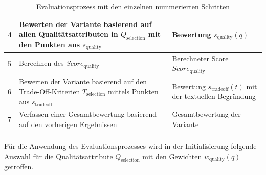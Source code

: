 \begin{longtable}{|
  L{1cm}|
  p{\dimexpr\textwidth-4cm-6\arrayrulewidth\relax}|
  L{3cm}|
}
    4 & Bewerten der Variante basierend auf allen Qualitätsattributen in $Q_{\text{selection}}$ mit den Punkten aus $s_{\text{quality}}$ &
    Bewertung $s_{\text{quality}}(q)$
    \\
    \hline

    5 & Berechnen des $Score_{\text{quality}}$ &
    Berechneter Score $Score_{\text{quality}}$
    \\
    \hline

    6 & Bewerten der Variante basierend auf den Trade-Off-Kriterien $T_{\text{selection}}$ mittels Punkten aus $s_{\text{tradeoff}}$ &
    Bewertung $s_{\text{tradeoff}}(t)$ mit der textuellen Begründung
    \\
    \hline

    7 & Verfassen einer Gesamtbewertung basierend auf den vorherigen Ergebnissen & Gesamtbewertung der Variante
    \\
    \hline

    \caption{Evaluationsprozess mit den einzelnen nummerierten Schritten}
    \label{tab:evaluation-process-steps}
\end{longtable}


Für die Anwendung des Evaluationsprozesses wird in der Initialisierung folgende Auswahl für die Qualitätsattribute $Q_{\text{selection}}$ mit den Gewichten $w_{\text{quality}}(q)$ getroffen.

